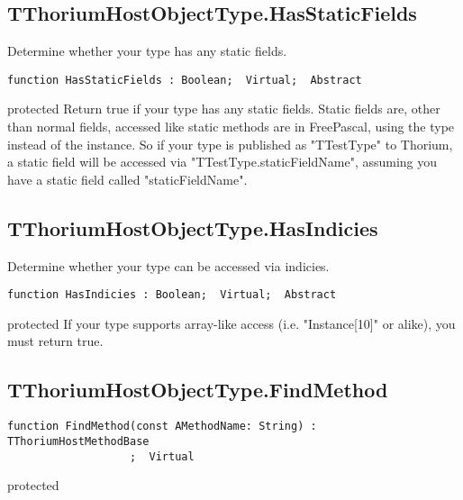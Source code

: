 \subsection{TThoriumHostObjectType.HasStaticFields}
\label{thoriumcorepkg:thorium:tthoriumhostobjecttype:hasstaticfields}
\begin{FPCList}
\Synopsis
Determine whether your type has any static fields.\Declaration 

\begin{verbatim}
function HasStaticFields : Boolean;  Virtual;  Abstract
\end{verbatim}
\Visibility
protected
\Description
Return true if your type has any static fields. Static fields are, other than normal fields, accessed like static methods are in FreePascal, using the type instead of the instance. So if your type is published as "TTestType" to Thorium, a static field will be accessed via "TTestType.staticFieldName", assuming you have a static field called "staticFieldName".\end{FPCList}
\subsection{TThoriumHostObjectType.HasIndicies}
\label{thoriumcorepkg:thorium:tthoriumhostobjecttype:hasindicies}
\begin{FPCList}
\Synopsis
Determine whether your type can be accessed via indicies.\Declaration 

\begin{verbatim}
function HasIndicies : Boolean;  Virtual;  Abstract
\end{verbatim}
\Visibility
protected
\Description
If your type supports array-like access (i.e. "Instance[10]" or alike), you must return true.\end{FPCList}
\subsection{TThoriumHostObjectType.FindMethod}
\label{thoriumcorepkg:thorium:tthoriumhostobjecttype:findmethod}
\begin{FPCList}
\Declaration 

\begin{verbatim}
function FindMethod(const AMethodName: String) : TThoriumHostMethodBase
                   ;  Virtual
\end{verbatim}
\Visibility
protected
\end{FPCList}
